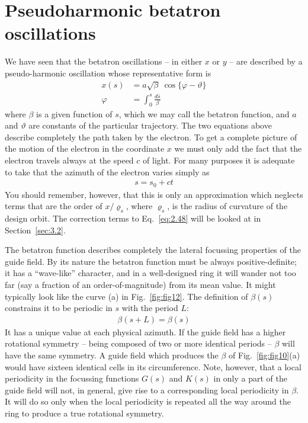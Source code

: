 \section{Pseudoharmonic betatron oscillations}\label{sec:2.6}
We have seen that the betatron oscillations -- in either $x$ or $y$ -- are described by a pseudo-harmonic oscillation whose representative form is
\begin{align}
	x(s) &= a\sqrt{\beta}\ \cos\{\varphi-\vartheta\}\label{eq:2.46}\\
	\varphi &= \int_{0}^{s} \frac{d\bar{s}}{\beta}\label{eq:2.47}
\end{align}
where $\beta$ is a given function of $s$, which we may call the betatron function, and $a$
and $\vartheta$ are constants of the particular trajectory. The two equations above describe completely the path taken by the electron. To get a complete picture of the motion of the electron in the coordinate $x$ we must only add the fact that the electron travels always at the speed $c$ of light. For many purposes it is adequate to take that the azimuth of the electron varies simply as
\begin{align}
	s = s_0 + ct\label{eq:2.48}
\end{align}
You should remember, however, that this is only an approximation which neglects terms that are the order of $x/\varrho_s$, where $\varrho_s$, is the radius of curvature of the design orbit. The correction terms to Eq.~\eqref{eq:2.48} will be looked at in Section~\ref{sec:3.2}.

The betatron function describes completely the lateral focussing properties of the guide field. By its nature the betatron function must be always positive-definite; it has a “wave-like” character, and in a well-designed ring it will wander not too far (say a fraction of an order-of-magnitude) from its mean value. It might typically look like the curve (a) in Fig.~\ref{fig:fig12}. The definition of $\beta(s)$ constrains it to be periodic in $s$ with the period $L$:
\begin{align}
	\beta(s+L) = \beta(s)
\end{align}
It has a unique value at each physical azimuth. If the guide field has a higher rotational symmetry -- being composed of two or more identical periods -- $\beta$ will have the same symmetry. A guide field which produces the $\beta$ of Fig.~\ref{fig:fig10}(a) would have sixteen identical cells in its circumference. Note, however, that a local periodicity in the focussing functions $G(s)$ and $K(s)$ in only a part of the guide field will not, in general, give rise to a corresponding local periodicity in $\beta$. It will do so only when the local periodicity is repeated all the way around the ring to produce a true rotational symmetry.

